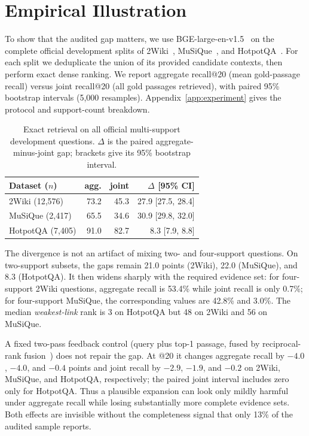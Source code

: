 \documentclass[11pt]{article}
\begin{document}
\section{Empirical Illustration}
\label{sec:experiment}
To show that the audited gap matters, we use BGE-large-en-v1.5~\citep{bge} on the complete official
development splits of 2Wiki~\citep{2wiki}, MuSiQue~\citep{musique}, and
HotpotQA~\citep{hotpotqa}. For each split we deduplicate the union of its provided candidate contexts,
then perform exact dense ranking. We report aggregate recall@20 (mean gold-passage recall) versus joint
recall@20 (all gold passages retrieved), with paired 95\% bootstrap intervals (5,000 resamples).
Appendix~\ref{app:experiment} gives the protocol and support-count breakdown.

\begin{table}[t]\centering\small
\caption{Exact retrieval on all official multi-support development questions. $\Delta$ is the paired
aggregate-minus-joint gap; brackets give its 95\% bootstrap interval.}
\label{tab:exp}
\begin{tabular}{@{}lrrr@{}}
\toprule
\textbf{Dataset ($n$)} & \textbf{agg.} & \textbf{joint} & \textbf{$\Delta$ [95\% CI]} \\
\midrule
2Wiki (12,576) & 73.2 & 45.3 & 27.9 [27.5, 28.4] \\
MuSiQue (2,417) & 65.5 & 34.6 & 30.9 [29.8, 32.0] \\
HotpotQA (7,405) & 91.0 & 82.7 & 8.3 [7.9, 8.8] \\
\bottomrule
\end{tabular}
\end{table}

The divergence is not an artifact of mixing two- and four-support questions. On two-support subsets,
the gaps remain 21.0 points (2Wiki), 22.0 (MuSiQue), and 8.3 (HotpotQA). It then widens sharply with
the required evidence set: for four-support 2Wiki questions, aggregate recall is 53.4\% while joint
recall is only 0.7\%; for four-support MuSiQue, the corresponding values are 42.8\% and 3.0\%.
The median \emph{weakest-link} rank is 3 on HotpotQA but 48 on 2Wiki and 56 on MuSiQue.

A fixed two-pass feedback control (query plus top-1 passage, fused by reciprocal-rank
fusion~\citep{rrf}) does not repair the gap. At @20 it changes aggregate recall by $-4.0$, $-4.0$,
and $-0.4$ points and joint recall by $-2.9$, $-1.9$, and $-0.2$ on 2Wiki, MuSiQue, and HotpotQA,
respectively; the paired joint interval includes zero only for HotpotQA. Thus a plausible expansion
can look only mildly harmful under aggregate recall while losing substantially more complete evidence
sets. Both effects are invisible without the completeness signal that only 13\% of the audited sample reports.
\end{document}
